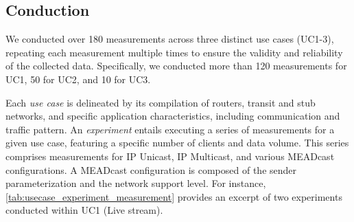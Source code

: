 
\subsection{Conduction} %
\label{sub:Conduction}

We conducted over 180 measurements across three distinct use cases (UC1-3),
    repeating each measurement multiple times to ensure the validity and
    reliability of the collected data.
Specifically, we conducted more than 120 measurements for UC1, 50 for UC2, and
    10 for UC3.

Each \textit{use case} is delineated by its compilation of routers, transit and
    stub networks, and specific application characteristics, including
    communication and traffic pattern.
An \textit{experiment} entails executing a series of measurements for a given
    use case, featuring a specific number of clients and data volume.
This series comprises measurements for IP Unicast, IP Multicast, and various 
    MEADcast configurations.
A MEADcast configuration is composed of the sender parameterization and the 
    network support level.
For instance, \autoref{tab:usecase_experiment_measurement} provides an excerpt
    of two experiments conducted within UC1 (Live stream).

